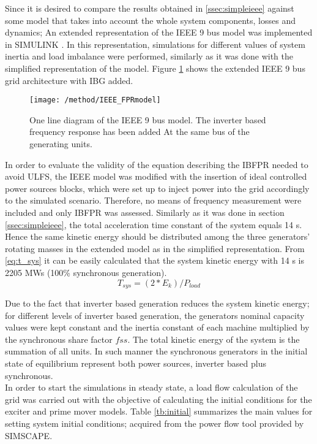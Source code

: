 Since it is desired to compare the results obtained in \ref{ssec:simpleieee} against some model that takes into account the whole system components, losses and dynamics; An  extended representation of the IEEE 9 bus model was implemented in SIMULINK \cite{delavari2018simscape}. In this representation, simulations for different values of system inertia and load imbalance were performed, similarly as it was done with the simplified representation of the model. Figure \ref{fig:ieeeext} shows the extended IEEE 9 bus grid architecture with IBG added.\\
\begin{figure}[h]
	\centering
	\texttt{[image: /method/IEEE\_FPRmodel]}
	\caption{One line diagram of the IEEE 9 bus model. The inverter based frequency response has been added At the same bus of the generating units.}
	\label{fig:ieeeext}
\end{figure}
In order to evaluate the validity of the equation describing the IBFPR needed to avoid ULFS, the IEEE model was modified with the insertion of ideal controlled power sources blocks, which were set up to inject power into the grid accordingly to the simulated scenario. Therefore, no means of frequency measurement were included and only IBFPR was assessed.
Similarly as it was done in section \ref{ssec:simpleieee}, the total acceleration time constant of the system equals 14 s. Hence the same kinetic energy should be distributed among the three generators' rotating masses in the extended model as in the simplified representation. From \eqref{eq:t_sys} it can be easily calculated that the system kinetic energy with 14 s is 2205 MWs (100\% synchronous generation).
\begin{equation}
	\label{eq:t_sys}
	T_{sys}=(2*E_{k})/P_{load}
\end{equation}
 
Due to the fact that inverter based generation reduces the system kinetic energy; for different levels of inverter based generation,  the generators nominal capacity values were kept constant and the inertia constant of each machine multiplied by the synchronous share factor $ fss $. The total kinetic energy of the system is the summation of all units. In such manner the synchronous generators in the initial state of equilibrium represent both power sources, inverter based plus synchronous.\\
In order to start the simulations in steady state, a load flow calculation of the grid was carried out with the objective of calculating the initial conditions for the exciter and prime mover models. 
Table \ref{tb:initial} summarizes the main values for setting system initial conditions; acquired from the power flow tool provided by SIMSCAPE.


